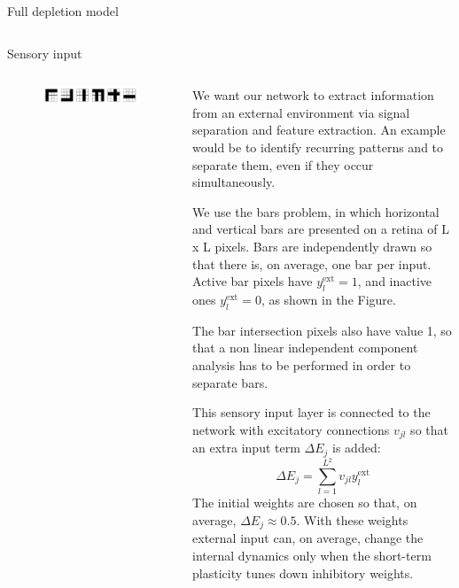 \documentclass[final,hyperref={pdfpagelabels=false}]{beamer}
\begin{document}
\begin{frame}
\begin{columns}
\begin{column}{.64\textwidth}
\begin{minipage}[T]{.95\textwidth}
{\begin{block}{Full depletion model}
\begin{columns}
\begin{column}[T]{.5\textwidth}
							\end{column}
						\end{columns}
					\end{block}
					
					\begin{block}{Sensory input}
						\begin{columns}
							\begin{column}[T]{.1\textwidth}
									\begin{figure}[T]
										\includegraphics[width=3.5\textwidth, angle=-90]{input_ex6.pdf}
																		
									\end{figure}
							\end{column}
							
							\begin{column}[T]{.9\textwidth}
								We want our network to extract information from an external environment via signal separation and feature extraction. An example would be to identify recurring patterns and to separate them, even if they occur simultaneously.
													
								We use the bars problem, in which horizontal and vertical bars are presented on a retina of L x L pixels. Bars are independently drawn so that there is, on average, one bar per input. Active bar pixels have $y_l^{\text{ext}}=1$, and inactive ones $y_l^{\text{ext}}=0$, as shown in the Figure.
														
								The bar intersection pixels also have value 1, so that a non linear independent component analysis has to be performed in order to separate bars.
								
								This sensory input layer is connected to the network with excitatory connections $v_{jl}$ so that an extra input term $\Delta E_j$ is added:
								\begin{equation*}
									\Delta E_j = \sum_{l=1}^{L^2} v_{jl} y_l^{\text{ext}}
								\end{equation*}
								The initial weights are chosen so that, on average, $\Delta E_j \approx 0.5$. With these weights external input can, on average, change the internal dynamics only when the short-term plasticity tunes down inhibitory weights.
							

\end{column}
\end{columns}
\end{block}}
\end{minipage}
\end{column}
\end{columns}
\end{frame}
\end{document}
